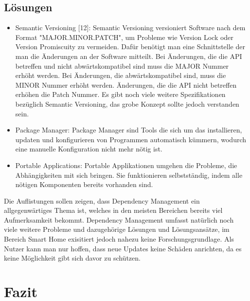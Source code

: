 \subsection{Lösungen}
\begin{itemize}
 \item Semantic Versioning [12]: Semantic Versioning versioniert Software nach dem Format "MAJOR.MINOR.PATCH", um Probleme wie Version Lock 
oder Version Promiscuity zu vermeiden. Dafür benötigt 
man eine Schnittstelle der man die Änderungen an der Software mitteilt. Bei Änderungen, die die API betreffen und nicht abwärtskompatibel
sind muss die MAJOR Nummer erhöht werden. Bei Änderungen, die abwärtskompatibel sind, muss die MINOR Nummer erhöht werden. 
Änderungen, die die API nicht betreffen erhöhen die Patch Nummer. Es gibt noch viele weitere Spezifikationen bezüglich Semantic
Versioning, das grobe Konzept sollte jedoch verstanden sein. 
\item Package Manager: Package Manager sind Tools die sich um das installieren, updaten und konfigurieren von Programmen automatisch
kümmern, wodurch eine manuelle Konfiguration nicht mehr nötig ist.
\item Portable Applications: Portable Applikationen umgehen die Probleme, die
Abhängigkeiten mit sich bringen. Sie funktionieren selbstständig,
indem alle nötigen Komponenten bereits vorhanden sind.
\end{itemize}

Die Auflistungen sollen zeigen, dass Dependency Management ein allgegenwärtiges Thema ist, welches in den meisten Bereichen bereits
viel Aufmerksamkeit bekommt. Dependency Management umfasst natürlich noch viele weitere Probleme und dazugehörige Lösungen und Lösungsansätze,
im Bereich Smart Home exisitiert jedoch nahezu keine Forschungsgrundlage. Als Nutzer kann man nur hoffen, dass neue Updates keine Schäden anrichten, 
da es keine Möglichkeit gibt sich davor zu schützen. 


\section{Fazit}

